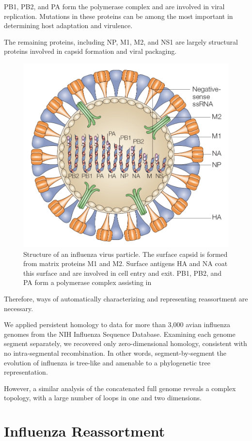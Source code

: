 PB1, PB2, and PA form the polymerase complex and are involved in viral replication.
Mutations in these proteins can be among the most important in determining host adaptation and virulence.

The remaining proteins, including NP, M1, M2, and NS1 are largely structural proteins involved in capsid formation and viral packaging.

\begin{figure}
\begin{center}
\centerline{\includegraphics[width=.5\columnwidth]{./fig/influenza/flu_genome.jpg}}
\caption[Structure of an influenza virus particle]{Structure of an influenza virus particle. The surface capsid is formed from matrix proteins M1 and M2. Surface antigens HA and NA coat this surface and are involved in cell entry and exit. PB1, PB2, and PA form a polymerase complex assisting in }
\label{fig:flu:genome}
\end{center}
\end{figure}

Therefore, ways of automatically characterizing and representing reassortment are necessary.

We applied persistent homology to data for more than 3,000 avian influenza genomes from the NIH Influenza Sequence Database.
Examining each genome segment separately, we recovered only zero-dimensional homology, consistent with no intra-segmental recombination.
In other words, segment-by-segment the evolution of influenza is tree-like and amenable to a phylogenetic tree representation.

However, a similar analysis of the concatenated full genome reveals a complex topology, with a large number of loops in one and two dimensions.

\section{Influenza Reassortment}
\label{flu:reassortment}

